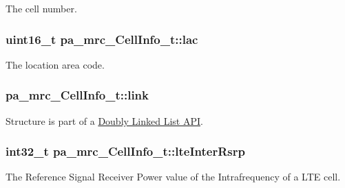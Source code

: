 The cell number. 

\subsubsection[{\texorpdfstring{lac}{lac}}]{\setlength{\rightskip}{0pt plus 5cm}uint16\+\_\+t pa\+\_\+mrc\+\_\+\+Cell\+Info\+\_\+t\+::lac}\hypertarget{structpa__mrc___cell_info__t_a5b56d1b1a885b474a024a978fc2a3cbf}{}\label{structpa__mrc___cell_info__t_a5b56d1b1a885b474a024a978fc2a3cbf}


The location area code. 

\subsubsection[{\texorpdfstring{link}{link}}]{ pa\+\_\+mrc\+\_\+\+Cell\+Info\+\_\+t\+::link}\hypertarget{structpa__mrc___cell_info__t_a5db4402db950ddff1170d5786a304e72}{}\label{structpa__mrc___cell_info__t_a5db4402db950ddff1170d5786a304e72}


Structure is part of a \hyperlink{c_doublyLinkedList}{Doubly Linked List A\+PI}. 

\subsubsection[{\texorpdfstring{lte\+Inter\+Rsrp}{lteInterRsrp}}]{\setlength{\rightskip}{0pt plus 5cm}int32\+\_\+t pa\+\_\+mrc\+\_\+\+Cell\+Info\+\_\+t\+::lte\+Inter\+Rsrp}\hypertarget{structpa__mrc___cell_info__t_ae576686e484eb2beed1c2c439e31221e}{}\label{structpa__mrc___cell_info__t_ae576686e484eb2beed1c2c439e31221e}
The Reference Signal Receiver Power value of the Intrafrequency of a L\+TE cell. 
